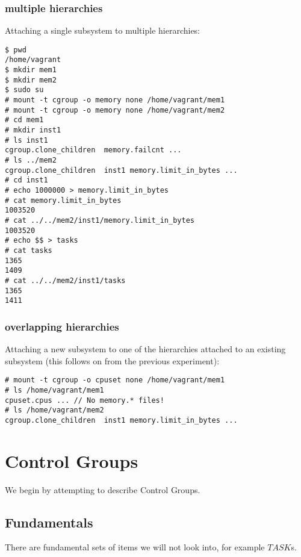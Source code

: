 \documentclass[a4paper,twoside,12pt]{article}
\begin{document}
\subsubsection*{multiple hierarchies}

Attaching a single subsystem to multiple hierarchies:
{\small \begin{verbatim}
$ pwd   
/home/vagrant
$ mkdir mem1
$ mkdir mem2
$ sudo su
# mount -t cgroup -o memory none /home/vagrant/mem1
# mount -t cgroup -o memory none /home/vagrant/mem2
# cd mem1
# mkdir inst1  
# ls inst1 
cgroup.clone_children  memory.failcnt ...
# ls ../mem2
cgroup.clone_children  inst1 memory.limit_in_bytes ...
# cd inst1
# echo 1000000 > memory.limit_in_bytes 
# cat memory.limit_in_bytes 
1003520
# cat ../../mem2/inst1/memory.limit_in_bytes 
1003520
# echo $$ > tasks
# cat tasks
1365
1409
# cat ../../mem2/inst1/tasks
1365
1411
\end{verbatim}}

\subsubsection*{overlapping hierarchies}

Attaching a new subsystem to one of the hierarchies attached to an existing subsystem (this follows on from the previous experiment):
{\small \begin{verbatim}
# mount -t cgroup -o cpuset none /home/vagrant/mem1
# ls /home/vagrant/mem1
cpuset.cpus ... // No memory.* files!
# ls /home/vagrant/mem2
cgroup.clone_children  inst1 memory.limit_in_bytes ...
\end{verbatim}}

\section{Control Groups}

We begin by attempting to describe Control Groups.

\subsection{Fundamentals}
There are fundamental sets of items we will not look into, for example $TASK$s.
\begin{zed}
[TASK]
\end{zed}
\end{document}
